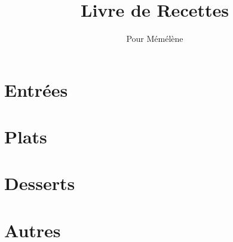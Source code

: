 \documentclass{recipe-book}
\title{Livre de Recettes}
\author{Pour Mémélène}
\date{}
\begin{document}
\chapter{Entrées}
%
\chapter{Plats}

\chapter{Desserts}

\chapter{Autres}
\end{document}
